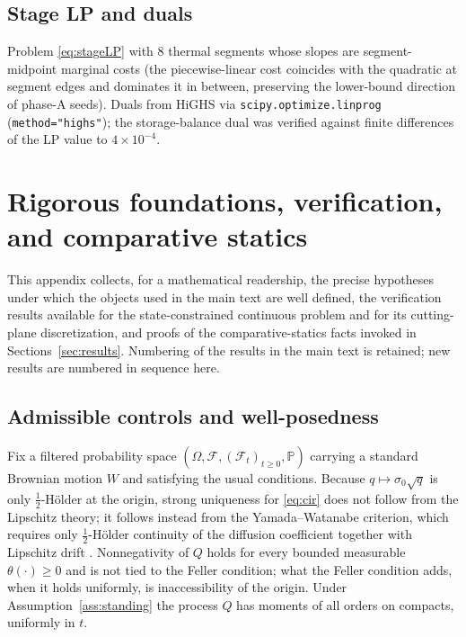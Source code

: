\documentclass[pdflatex,sn-mathphys-num]{sn-jnl}
\theoremstyle{thmstyleone}
\theoremstyle{thmstyletwo}
\theoremstyle{thmstylethree}
\newcommand{\Prob}{\mathbb{P}}
\begin{document}
\begin{appendices}
\subsection*{Stage LP and duals} Problem \eqref{eq:stageLP} with $8$
thermal segments whose slopes are segment-midpoint marginal costs (the
piecewise-linear cost coincides with the quadratic at segment edges and
dominates it in between, preserving the lower-bound direction of
phase-A seeds). Duals from HiGHS via \texttt{scipy.optimize.linprog}
(\texttt{method="highs"}); the storage-balance dual was verified against
finite differences of the LP value to $4\times10^{-4}$.

\section{Rigorous foundations, verification, and comparative statics}
\label{app:math}

This appendix collects, for a mathematical readership, the precise
hypotheses under which the objects used in the main text are well defined,
the verification results available for the state-constrained continuous
problem and for its cutting-plane discretization, and proofs of the
comparative-statics facts invoked in Sections~\ref{sec:results}. Numbering
of the results in the main text is retained; new results are numbered in
sequence here.

\subsection{Admissible controls and well-posedness}
\label{app:wellposed}

Fix a filtered probability space $(\Omega,\mathcal F,(\mathcal F_t)_{t\ge0},
\Prob)$ carrying a standard Brownian motion $W$ and satisfying the usual
conditions. Because $q\mapsto\sigma_0\sqrt{q}$ is only $\tfrac12$-H\"older
at the origin, strong uniqueness for \eqref{eq:cir} does not follow from
the Lipschitz theory; it follows instead from the Yamada--Watanabe
criterion, which requires only $\tfrac12$-H\"older continuity of the
diffusion coefficient together with Lipschitz drift
\citep{yamada1971,karatzas1991}. Nonnegativity of $Q$ holds for every
bounded measurable $\theta(\cdot)\ge0$ and is not tied to the Feller
condition; what the Feller condition adds, when it holds uniformly, is
inaccessibility of the origin. Under Assumption~\ref{ass:standing} the
process $Q$ has moments of all orders on compacts, uniformly in $t$.


\end{appendices}
\end{document}
